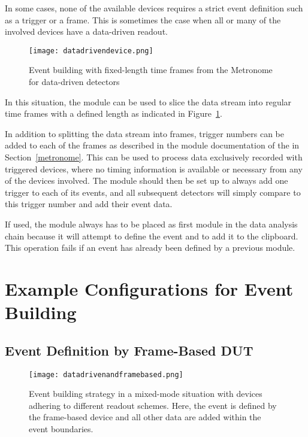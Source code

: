 In some cases, none of the available devices requires a strict event definition such as a trigger or a frame.
This is sometimes the case when all or many of the involved devices have a data-driven readout.

\begin{figure}[tbp]
        \centering
        \texttt{[image: datadrivendevice.png]}
        \caption{Event building with fixed-length time frames from the Metronome for data-driven detectors}
        \label{fig:datadriven}
\end{figure}

In this situation, the  module can be used to slice the data stream into regular time frames with a defined length as indicated in Figure~\ref{fig:datadriven}.

In addition to splitting the data stream into frames, trigger numbers can be added to each of the frames as described in the module documentation of the  in Section~\ref{metronome}.
This can be used to process data exclusively recorded with triggered devices, where no timing information is available or necessary from any of the devices involved.
The module should then be set up to always add one trigger to each of its events, and all subsequent detectors will simply compare to this trigger number and add their event data.

If used, the  module always has to be placed as first module in the data analysis chain because it will attempt to define the event and to add it to the clipboard.
This operation fails if an event has already been defined by a previous module.


\section{Example Configurations for Event Building}

\subsection{Event Definition by Frame-Based DUT}

\begin{figure}[tbp]
        \centering
        \texttt{[image: datadrivenandframebased.png]}
        \caption{Event building strategy in a mixed-mode situation with devices adhering to different readout schemes. Here, the event is defined by the frame-based device and all other data are added within the event boundaries.}
        \label{fig:datadrivenandframebased}
\end{figure}

